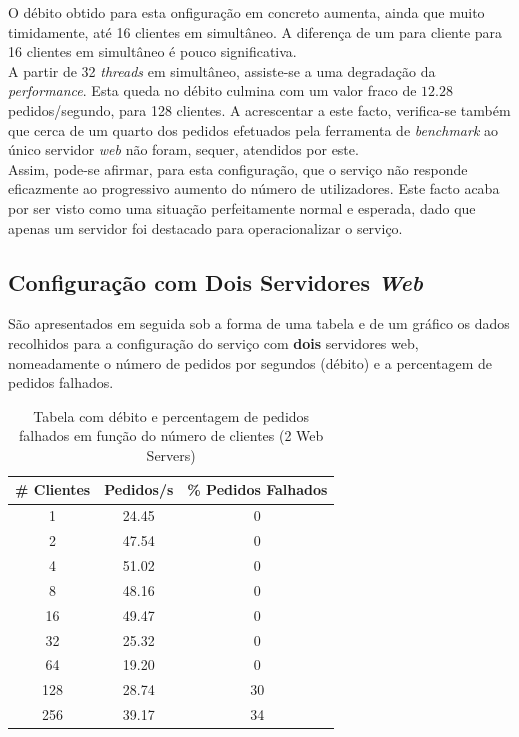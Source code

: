 \newpage
{}

O débito obtido para esta onfiguração em concreto aumenta, ainda que muito timidamente, até 16 clientes em simultâneo.
A diferença de um para cliente para 16 clientes em simultâneo é pouco significativa. \\

A partir de 32 \textit{threads} em simultâneo, assiste-se a uma degradação da \textit{performance}.
Esta queda no débito culmina com um valor fraco de $12.28$ pedidos/segundo, para 128 clientes.
A acrescentar a este facto, verifica-se também que cerca de um quarto dos pedidos efetuados pela ferramenta de \textit{benchmark} ao único servidor \textit{web} não foram, sequer, atendidos por este. \\

Assim, pode-se afirmar, para esta configuração, que o serviço não responde eficazmente ao progressivo aumento do número de utilizadores.
Este facto acaba por ser visto como uma situação perfeitamente normal e esperada, dado que apenas um servidor foi destacado para operacionalizar o serviço.


\subsection{Configuração com Dois Servidores \textit{Web}}


São apresentados em seguida sob a forma de uma tabela e de um gráfico os dados recolhidos para a configuração do serviço com \textbf{dois} servidores web, nomeadamente o número de pedidos por segundos (débito) e a percentagem de pedidos falhados. \\

\begin{table}[!h]
\centering
\begin{tabular}{|c|c|c|}
\hline
\textbf{\# Clientes} & \textbf{Pedidos/s} & \textbf{\% Pedidos Falhados} \\ \hline
1 & 24.45 & 0 \\ \hline
2 & 47.54 & 0 \\ \hline
4 & 51.02 & 0 \\ \hline
8 & 48.16 & 0 \\ \hline
16 & 49.47 & 0 \\ \hline
32 & 25.32 & 0 \\ \hline
64 & 19.20 & 0 \\ \hline
128 & 28.74 & 30 \\ \hline
256 & 39.17 & 34 \\ \hline
\end{tabular}
\caption{Tabela com débito e percentagem de pedidos falhados em função do número de clientes (2 Web Servers)}
\end{table}

